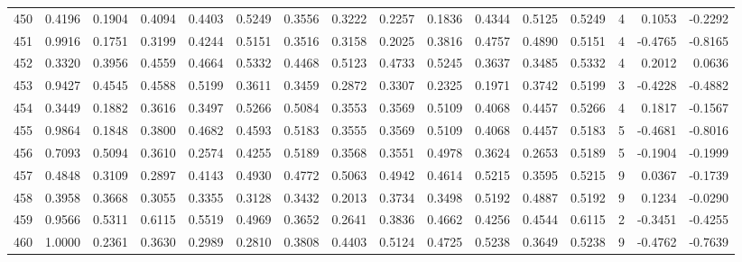 \begin{tabular}{lrrrrrrrrrrrrrrr}
450 &      0.4196 &  0.1904 &  0.4094 &  0.4403 &  0.5249 &  0.3556 &  0.3222 &  0.2257 &  0.1836 &  0.4344 &   0.5125 &     0.5249 &      4 &                    0.1053 &                    -0.2292 \\
451 &      0.9916 &  0.1751 &  0.3199 &  0.4244 &  0.5151 &  0.3516 &  0.3158 &  0.2025 &  0.3816 &  0.4757 &   0.4890 &     0.5151 &      4 &                   -0.4765 &                    -0.8165 \\
452 &      0.3320 &  0.3956 &  0.4559 &  0.4664 &  0.5332 &  0.4468 &  0.5123 &  0.4733 &  0.5245 &  0.3637 &   0.3485 &     0.5332 &      4 &                    0.2012 &                     0.0636 \\
453 &      0.9427 &  0.4545 &  0.4588 &  0.5199 &  0.3611 &  0.3459 &  0.2872 &  0.3307 &  0.2325 &  0.1971 &   0.3742 &     0.5199 &      3 &                   -0.4228 &                    -0.4882 \\
454 &      0.3449 &  0.1882 &  0.3616 &  0.3497 &  0.5266 &  0.5084 &  0.3553 &  0.3569 &  0.5109 &  0.4068 &   0.4457 &     0.5266 &      4 &                    0.1817 &                    -0.1567 \\
455 &      0.9864 &  0.1848 &  0.3800 &  0.4682 &  0.4593 &  0.5183 &  0.3555 &  0.3569 &  0.5109 &  0.4068 &   0.4457 &     0.5183 &      5 &                   -0.4681 &                    -0.8016 \\
456 &      0.7093 &  0.5094 &  0.3610 &  0.2574 &  0.4255 &  0.5189 &  0.3568 &  0.3551 &  0.4978 &  0.3624 &   0.2653 &     0.5189 &      5 &                   -0.1904 &                    -0.1999 \\
457 &      0.4848 &  0.3109 &  0.2897 &  0.4143 &  0.4930 &  0.4772 &  0.5063 &  0.4942 &  0.4614 &  0.5215 &   0.3595 &     0.5215 &      9 &                    0.0367 &                    -0.1739 \\
458 &      0.3958 &  0.3668 &  0.3055 &  0.3355 &  0.3128 &  0.3432 &  0.2013 &  0.3734 &  0.3498 &  0.5192 &   0.4887 &     0.5192 &      9 &                    0.1234 &                    -0.0290 \\
459 &      0.9566 &  0.5311 &  0.6115 &  0.5519 &  0.4969 &  0.3652 &  0.2641 &  0.3836 &  0.4662 &  0.4256 &   0.4544 &     0.6115 &      2 &                   -0.3451 &                    -0.4255 \\
460 &      1.0000 &  0.2361 &  0.3630 &  0.2989 &  0.2810 &  0.3808 &  0.4403 &  0.5124 &  0.4725 &  0.5238 &   0.3649 &     0.5238 &      9 &                   -0.4762 &                    -0.7639 \\

\end{tabular}
